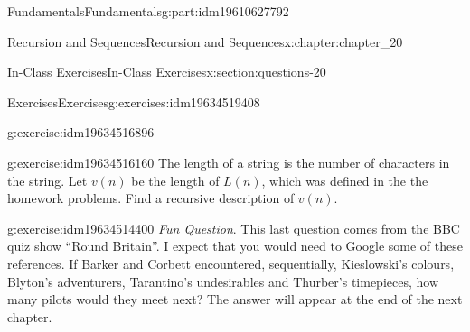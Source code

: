 \documentclass[oneside,10pt,]{book}
\numberwithin{equation}{section}
\newenvironment{codedisplay}
{\VerbatimEnvironment\begin{center}\begin{lrbox}{\codedisplaybox}\begin{BVerbatim}}
{\end{BVerbatim}\end{lrbox}\usebox{\codedisplaybox}\end{center}}
\begin{document}
\begin{partptx}{Fundamentals}{}{Fundamentals}{}{}{g:part:idm19610627792}
\begin{chapterptx}{Recursion and Sequences}{}{Recursion and Sequences}{}{}{x:chapter:chapter_20}
\begin{sectionptx}{In-Class Exercises}{}{In-Class Exercises}{}{}{x:section:questions-20}
\begin{exercises-subsection-numberless}{Exercises}{}{Exercises}{}{}{g:exercises:idm19634519408}
\begin{exercisegroup}
\begin{divisionexerciseeg}{3}{}{}{g:exercise:idm19634516896}
\end{divisionexerciseeg}%
\begin{divisionexerciseeg}{4}{}{}{g:exercise:idm19634516160}%
The length of a string is the number of characters in the string. Let \(v(n)\) be the length of \(L(n)\), which was defined in the the homework problems.  Find a recursive description of \(v(n)\).%
\end{divisionexerciseeg}%
\begin{divisionexerciseeg}{5}{}{}{g:exercise:idm19634514400}%
\emph{Fun Question}.  This last question comes from the BBC quiz show ``Round Britain''. I expect that you would need to Google some of these references.  If Barker and Corbett encountered, sequentially, Kieslowski's colours, Blyton's adventurers, Tarantino's undesirables and Thurber's timepieces, how many pilots would they meet next?  The answer will appear at the end of the next chapter.%
\end{divisionexerciseeg}%
\end{exercisegroup}
\par\medskip\noindent
\end{exercises-subsection-numberless}
\end{sectionptx}
%
%
\typeout{************************************************}
\typeout{************************************************}
%
\end{chapterptx}
\end{partptx}
\end{document}

